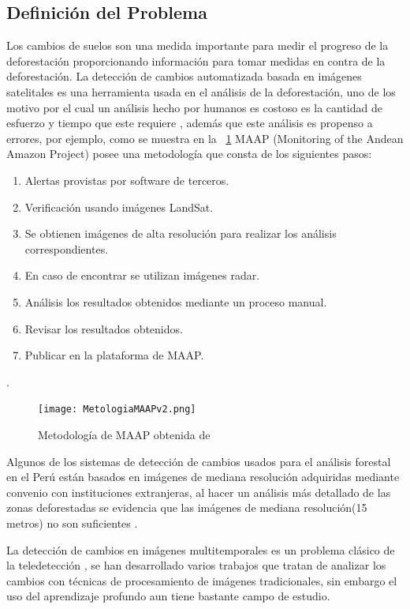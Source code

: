 \subsection{Definición del Problema}

Los cambios de suelos son una medida importante para medir el progreso de la deforestación proporcionando información para tomar medidas en contra de la deforestación. La detección de cambios automatizada basada en imágenes satelitales es una herramienta usada en el análisis de la deforestación, uno de los motivo por el cual un análisis hecho por humanos es costoso es la cantidad de esfuerzo y tiempo que este requiere \cite{SINGH1989}, además que este análisis es propenso a errores, por ejemplo, como se muestra en la \figureautorefname ~\ref{maap} MAAP (Monitoring of the Andean Amazon Project) posee una metodología que consta de los siguientes pasos: 
\begin{enumerate}
    \item Alertas provistas por software de terceros.
    \item Verificación usando imágenes LandSat.
    \item Se obtienen imágenes de alta resolución  para realizar los análisis correspondientes.
    \item En caso de encontrar se utilizan imágenes radar.
    \item Análisis los resultados obtenidos mediante un proceso manual.
    \item Revisar los resultados obtenidos.
    \item Publicar en la plataforma de \gls{MAAP}.
\end{enumerate}{}
.

\begin{figure}[H]

\centering
\texttt{[image: MetologiaMAAPv2.png]}
\caption{Metodología de \gls{MAAP} obtenida de \cite{AmazonConservation} }
\label{maap}

\end{figure}

Algunos de los sistemas de detección de cambios usados para el análisis forestal en el Perú están basados en imágenes de mediana resolución adquiridas mediante convenio con instituciones extranjeras, al hacer un análisis más detallado de las zonas deforestadas se evidencia que las imágenes de mediana resolución(15 metros) no son suficientes \cite{hansen2013high}.

La detección de cambios en imágenes multitemporales es un problema clásico de la teledetección \cite{Zhu2017}, se han desarrollado varios trabajos que tratan de analizar los cambios con técnicas de procesamiento de imágenes tradicionales\cite{AlenCastro2015,Anwar2012,Hirschmugl2014,Zhu2014,hansen2013high}, sin embargo el uso del aprendizaje profundo aun tiene bastante campo de estudio.

